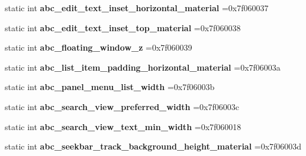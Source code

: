 \begin{DoxyCompactItemize}
\item 
\mbox{\label{classandroid_1_1support_1_1v4_1_1R_1_1dimen_aa2304d45a29d975384f909c50d5b9f28}} 
static int {\bfseries abc\+\_\+edit\+\_\+text\+\_\+inset\+\_\+horizontal\+\_\+material} =0x7f060037
\item 
\mbox{\label{classandroid_1_1support_1_1v4_1_1R_1_1dimen_a169819a14240d740cc022ddb3832fba2}} 
static int {\bfseries abc\+\_\+edit\+\_\+text\+\_\+inset\+\_\+top\+\_\+material} =0x7f060038
\item 
\mbox{\label{classandroid_1_1support_1_1v4_1_1R_1_1dimen_aa62dcea0a6ddc8607c3a6977565253ea}} 
static int {\bfseries abc\+\_\+floating\+\_\+window\+\_\+z} =0x7f060039
\item 
\mbox{\label{classandroid_1_1support_1_1v4_1_1R_1_1dimen_aa3ab48ecebaa935d3a5f134422a95f2e}} 
static int {\bfseries abc\+\_\+list\+\_\+item\+\_\+padding\+\_\+horizontal\+\_\+material} =0x7f06003a
\item 
\mbox{\label{classandroid_1_1support_1_1v4_1_1R_1_1dimen_a1c3ae1fa2873e4886388af824b32d120}} 
static int {\bfseries abc\+\_\+panel\+\_\+menu\+\_\+list\+\_\+width} =0x7f06003b
\item 
\mbox{\label{classandroid_1_1support_1_1v4_1_1R_1_1dimen_a29aa015373d418da1a5f50d609cb5507}} 
static int {\bfseries abc\+\_\+search\+\_\+view\+\_\+preferred\+\_\+width} =0x7f06003c
\item 
\mbox{\label{classandroid_1_1support_1_1v4_1_1R_1_1dimen_a2eb91e02fc442c153883f74f89714b3b}} 
static int {\bfseries abc\+\_\+search\+\_\+view\+\_\+text\+\_\+min\+\_\+width} =0x7f060018
\item 
\mbox{\label{classandroid_1_1support_1_1v4_1_1R_1_1dimen_abe7d30ad03da0be4451afe0fa13726ad}} 
static int {\bfseries abc\+\_\+seekbar\+\_\+track\+\_\+background\+\_\+height\+\_\+material} =0x7f06003d
\item 

\end{DoxyCompactItemize}
